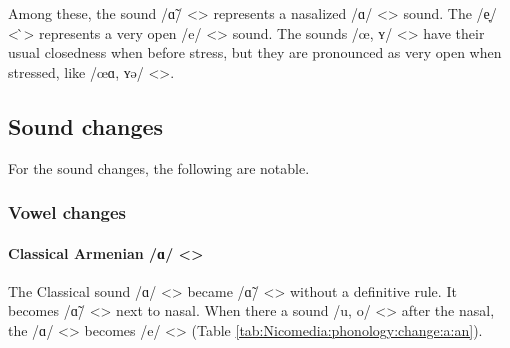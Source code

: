 Among these, the sound /ɑ̃/ <> represents a nasalized /ɑ/ <> sound. The /e̞/ < ̀> represents a very open /e/ <> sound. The sounds /œ, ʏ/ <> have their usual closedness when before stress, but they are pronounced as very open when stressed, like /œɑ, ʏə/ <>. 



\subsection{Sound changes}

For the sound changes, the following are notable. 


\subsubsection{Vowel changes}

\paragraph{Classical Armenian /ɑ/ <>}

The Classical sound /ɑ/ <> became /ɑ̃/ <> without a definitive rule. It becomes /ɑ̃/ <> next to nasal. When there a sound /u, o/ <> after the nasal, the /ɑ/ <> becomes /e/ <> (Table \ref{tab:Nicomedia:phonology:change:a:an}). 




\begin{table}[H]
	\centering 
	\caption{Change from Classical Armenian /ɑ/ <> to /e/ <> in the Nicomedia dialect}
	\label{tab:Nicomedia:phonology:change:a:an}
\end{table}



